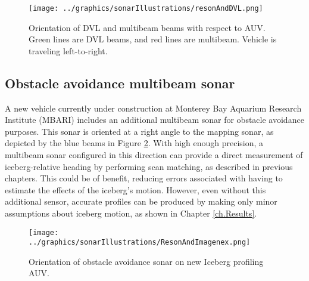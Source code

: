 \begin{figure}[htb]
   \centering
   \texttt{[image: ../graphics/sonarIllustrations/resonAndDVL.png]} %
   \caption{Orientation of DVL and multibeam beams with respect to AUV. Green lines are DVL beams, and red lines are multibeam. Vehicle is traveling left-to-right.}
   \label{fig:DVLandMulti}
\end{figure}

\subsection{Obstacle avoidance multibeam sonar}

A new vehicle currently under construction at Monterey Bay Aquarium Research Institute (MBARI) includes an additional multibeam sonar for obstacle avoidance purposes. This sonar is oriented at a right angle to the mapping sonar, as depicted by the blue beams in Figure \ref{fig:ObstandMulti}. With high enough precision, a multibeam sonar configured in this direction can provide a direct measurement of iceberg-relative heading by performing scan matching, as described in previous chapters. This could be of benefit, reducing errors associated with having to estimate the effects of the iceberg's motion. However, even without this additional sensor, accurate profiles can be produced by making only minor assumptions about iceberg motion, as shown in Chapter \ref{ch.Results}.

\begin{figure}[htb]
   \centering
   \texttt{[image: ../graphics/sonarIllustrations/ResonAndImagenex.png]} %
   \caption{Orientation of obstacle avoidance sonar on new Iceberg profiling AUV. }
   \label{fig:ObstandMulti}
\end{figure}

%
%

